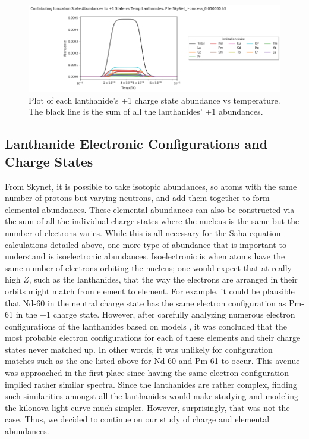 \documentclass[11pt,a4paper]{article}
\begin{document}
\begin{figure}[h!]
  \includegraphics[scale = .6]{plus_one.png}
  \caption{Plot of each lanthanide's +1 charge state abundance vs temperature. The black line is the sum of all the lanthanides' +1 abundances. }
\end{figure} 

\pagebreak
 
\subsection{Lanthanide Electronic Configurations and Charge States}

From Skynet, it is possible to take isotopic abundances, so atoms with the same number of protons but varying neutrons, and add them together to form elemental abundances. These elemental abundances can also be constructed via the sum of all the individual charge states where the nucleus is the same but the number of electrons varies. While this is all necessary for the Saha equation calculations detailed above, one more type of abundance that is important to understand is isoelectronic abundances. Isoelectronic is when atoms have the same number of electrons orbiting the nucleus; one would expect that at really high $Z$, such as the lanthanides, that the way the electrons are arranged in their orbits might match from element to element. For example, it could be plausible that Nd-60 in the neutral charge state has the same electron configuration as Pm-61 in the +1 charge state. However, after carefully analyzing numerous electron configurations of the lanthanides based on models \cite{Rodrigues_2004}, it was concluded that the most probable electron configurations for each of these elements and their charge states never matched up. In other words, it was unlikely for configuration matches such as the one listed above for Nd-60 and Pm-61 to occur.
This avenue was approached in the first place since having the same electron configuration implied rather similar spectra. Since the lanthanides are rather complex, finding such similarities amongst all the lanthanides would make studying and modeling the kilonova light curve much simpler. However, surprisingly, that was not the case. Thus, we decided to continue on our study of charge and elemental abundances.
\end{document}
